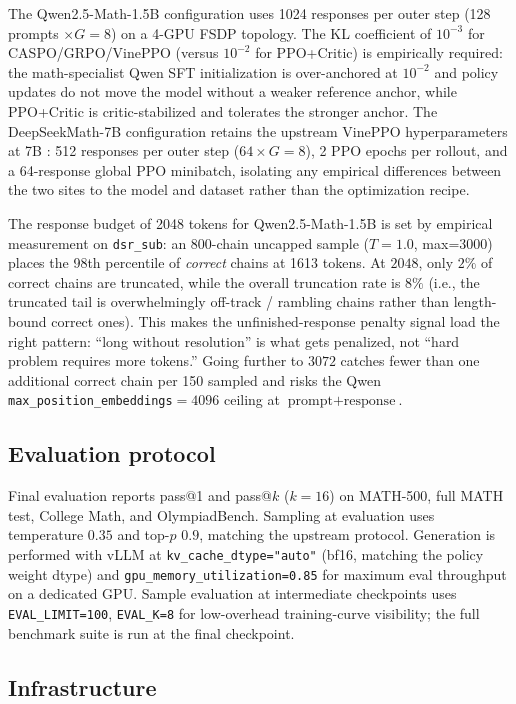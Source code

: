 \documentclass[11pt]{article}
\newcommand{\caspo}{\textsc{CASPO}}
\newcommand{\ppocritic}{PPO+Critic}
\newcommand{\grpo}{GRPO}
\newcommand{\vineppo}{VinePPO}
\begin{document}
The Qwen2.5-Math-1.5B configuration uses 1024 responses per outer step
(128 prompts $\times G{=}8$) on a 4-GPU FSDP topology. The KL coefficient
of $10^{-3}$ for \caspo{}/\grpo{}/\vineppo{} (versus $10^{-2}$ for
\ppocritic{}) is empirically required: the math-specialist Qwen SFT
initialization is over-anchored at $10^{-2}$ and policy updates do not
move the model without a weaker reference anchor, while \ppocritic{} is
critic-stabilized and tolerates the stronger anchor. The DeepSeekMath-7B
configuration retains the upstream \vineppo{} hyperparameters at 7B
\citep{vineppo2024,vineppocode}: 512 responses per outer step
($64 \times G{=}8$), 2 PPO epochs per rollout, and a 64-response global
PPO minibatch, isolating any empirical differences between the two sites
to the model and dataset rather than the optimization recipe.

The response budget of 2048 tokens for Qwen2.5-Math-1.5B is set by
empirical measurement on \texttt{dsr\_sub}: an 800-chain uncapped sample
($T{=}1.0$, max=3000) places the 98th percentile of \emph{correct} chains
at 1613 tokens. At $2048$, only $2\%$ of correct chains are truncated,
while the overall truncation rate is $8\%$ (i.e., the truncated tail is
overwhelmingly off-track / rambling chains rather than length-bound
correct ones). This makes the unfinished-response penalty signal load
the right pattern: ``long without resolution'' is what gets penalized,
not ``hard problem requires more tokens.'' Going further to $3072$ catches
fewer than one additional correct chain per 150 sampled and risks the
Qwen \texttt{max\_position\_embeddings}${=}4096$ ceiling at
$\text{prompt}+\text{response}$.

\subsection{Evaluation protocol}
Final evaluation reports pass@1 and pass@$k$ ($k=16$) on MATH-500, full MATH
test, College Math, and OlympiadBench. Sampling at evaluation uses
temperature $0.35$ and top-$p$ $0.9$, matching the upstream protocol.
Generation is performed with vLLM at \texttt{kv\_cache\_dtype="auto"}
(bf16, matching the policy weight dtype) and
\texttt{gpu\_memory\_utilization=0.85} for maximum eval throughput on a
dedicated GPU. Sample evaluation at intermediate checkpoints uses
\texttt{EVAL\_LIMIT=100}, \texttt{EVAL\_K=8} for low-overhead training-curve
visibility; the full benchmark suite is run at the final checkpoint.

\subsection{Infrastructure}
\label{sec:infra}
\end{document}
